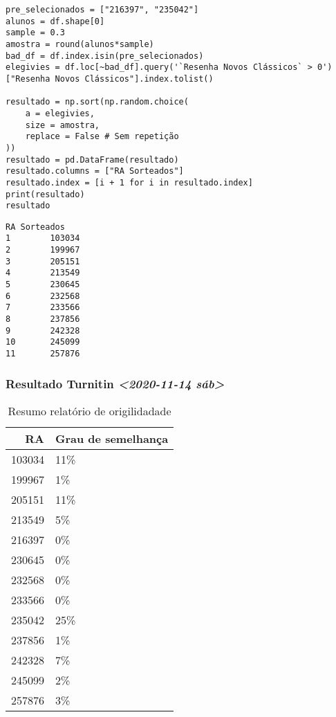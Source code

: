 \documentclass[11pt]{article}
\begin{document}
\begin{verbatim}
pre_selecionados = ["216397", "235042"]
alunos = df.shape[0]
sample = 0.3
amostra = round(alunos*sample)
bad_df = df.index.isin(pre_selecionados)
elegivies = df.loc[~bad_df].query('`Resenha Novos Clássicos` > 0')["Resenha Novos Clássicos"].index.tolist()

resultado = np.sort(np.random.choice(
    a = elegivies,
    size = amostra,
    replace = False # Sem repetição
))
resultado = pd.DataFrame(resultado)
resultado.columns = ["RA Sorteados"]
resultado.index = [i + 1 for i in resultado.index]
print(resultado)
resultado
\end{verbatim}

\begin{verbatim}
RA Sorteados
1        103034
2        199967
3        205151
4        213549
5        230645
6        232568
7        233566
8        237856
9        242328
10       245099
11       257876
\end{verbatim}





\subsubsection{Resultado Turnitin \textit{<2020-11-14 sáb>}}
\label{sec:org94e4033}

\begin{table}[htbp]
\caption{\label{TurnitinNvC}Resumo relatório de origilidadade}
\centering
\begin{tabular}{rl}
\hline
RA & Grau de semelhança\\
\hline
103034 & 11\%\\
199967 & 1\%\\
205151 & 11\%\\
213549 & 5\%\\
216397 & 0\%\\
230645 & 0\%\\
232568 & 0\%\\
233566 & 0\%\\
235042 & 25\%\\
237856 & 1\%\\
242328 & 7\%\\
245099 & 2\%\\
257876 & 3\%\\
\hline
\end{tabular}
\end{table}
\end{document}
